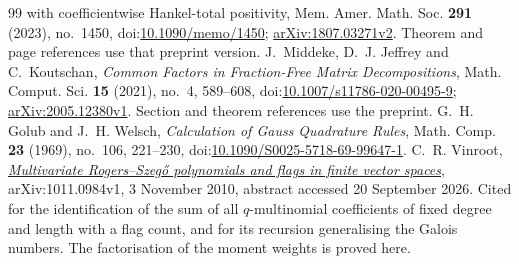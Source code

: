 \documentclass[11pt]{article}
\begin{document}
\begin{thebibliography}{99}
{  with coefficientwise Hankel-total positivity}, Mem. Amer. Math. Soc.
  \textbf{291} (2023), no.~1450,
  doi:\href{https://doi.org/10.1090/memo/1450}{10.1090/memo/1450};
  \href{https://arxiv.org/abs/1807.03271v2}{arXiv:1807.03271v2}.
  Theorem and page references use that preprint version.
 J.~Middeke, D.~J. Jeffrey and C.~Koutschan,
  \emph{Common Factors in Fraction-Free Matrix Decompositions},
  Math. Comput. Sci. \textbf{15} (2021), no.~4, 589--608,
  doi:\href{https://doi.org/10.1007/s11786-020-00495-9}{10.1007/s11786-020-00495-9};
  \href{https://arxiv.org/abs/2005.12380v1}{arXiv:2005.12380v1}.
  Section and theorem references use the preprint.
 G.~H. Golub and J.~H. Welsch,
  \emph{Calculation of Gauss Quadrature Rules}, Math. Comp. \textbf{23}
  (1969), no.~106, 221--230,
  doi:\href{https://doi.org/10.1090/S0025-5718-69-99647-1}{10.1090/S0025-5718-69-99647-1}.
 C.~R. Vinroot,
  \href{https://arxiv.org/abs/1011.0984}{\emph{Multivariate Rogers--Szeg\H{o}
  polynomials and flags in finite vector spaces}}, arXiv:1011.0984v1,
  3 November 2010, abstract accessed 20 September 2026.  Cited for the
  identification of the sum of all $q$-multinomial coefficients of fixed
  degree and length with a flag count, and for its recursion generalising the
  Galois numbers.  The factorisation of the moment weights is proved here.
\end{thebibliography}
\end{document}
